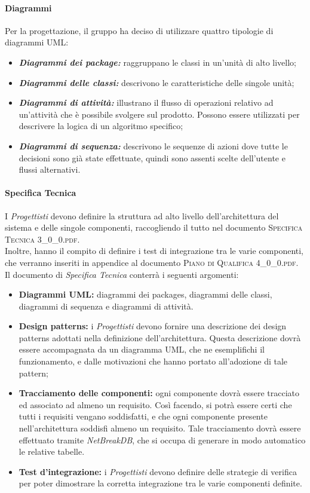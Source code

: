 		\paragraph{Diagrammi}
		Per la progettazione, il gruppo ha deciso di utilizzare quattro tipologie di diagrammi UML:
		\begin{itemize}
			\item \textbf{\textit{Diagrammi dei package:}} raggruppano le classi in un'unità di alto livello;
			\item \textbf{\textit{Diagrammi delle classi:}} descrivono le caratteristiche delle singole unità;
			\item \textbf{\textit{Diagrammi di attività:}} illustrano il flusso di operazioni relativo ad un'attività che è possibile svolgere sul prodotto. Possono essere utilizzati per descrivere la logica di un algoritmo specifico;
			\item \textbf{\textit{Diagrammi di sequenza:}} descrivono le sequenze di azioni dove tutte le decisioni sono già state effettuate, quindi sono assenti scelte dell'utente e flussi alternativi.
		\end{itemize}
	
	\paragraph{Specifica Tecnica}
	I \textit{Progettisti} devono definire la struttura ad alto livello dell'architettura del sistema e delle singole componenti, raccogliendo il tutto nel documento \textsc{Specifica Tecnica 3\_0\_0.pdf}.\\
	Inoltre, hanno il compito di definire i test di integrazione tra le varie componenti, che verranno inseriti in appendice al documento \textsc{Piano di Qualifica 4\_0\_0.pdf}. \\
	Il documento di \textit{Specifica Tecnica} conterrà i seguenti argomenti:
	\begin{itemize}
		\item \textbf{Diagrammi UML:} diagrammi dei packages, diagrammi delle classi, diagrammi di sequenza e diagrammi di attività.
		\item \textbf{Design patterns:} i \textit{Progettisti} devono fornire una descrizione dei design patterns adottati nella definizione dell'architettura. Questa descrizione dovrà essere accompagnata da un diagramma UML, che ne esemplifichi il funzionamento, e dalle motivazioni che hanno portato all'adozione di tale pattern;
		\item \textbf{Tracciamento delle componenti:} ogni componente dovrà essere tracciato ed associato ad almeno un requisito. Così facendo, si potrà essere certi che tutti i requisiti vengano soddisfatti, e che ogni componente presente nell'architettura soddisfi almeno un requisito. Tale tracciamento dovrà essere effettuato tramite \textit{NetBreakDB}, che si occupa di generare in modo automatico le relative tabelle.
		\item \textbf{Test d'integrazione:} i \textit{Progettisti} devono definire delle strategie di verifica per poter dimostrare la corretta integrazione tra le varie componenti definite.
	\end{itemize}
	
